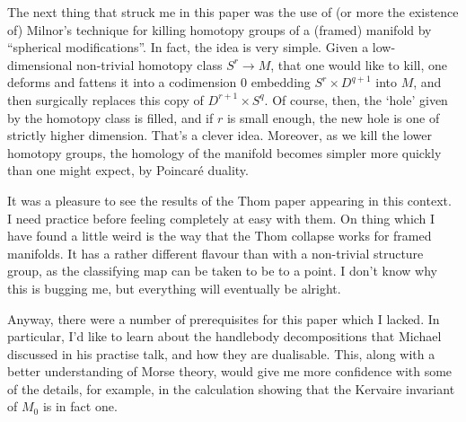 \documentclass[11pt]{article}
\begin{document}
\begin{KervaireNoDifferentiableStructure}
The next thing that struck me in this paper was the use of (or more the existence of) Milnor's technique for killing homotopy groups of a (framed) manifold by ``spherical modifications''. In fact, the idea is very simple. Given a low-dimensional non-trivial homotopy class $S^r\to M$, that one would like to kill, one deforms and fattens it into a codimension 0 embedding $S^r\times D^{q+1}$ into $M$, and then surgically replaces this copy of $D^{r+1}\times S^{q}$. Of course, then, the `hole' given by the homotopy class is filled, and if $r$ is small enough, the new hole is one of strictly higher dimension. That's a clever idea. Moreover, as we kill the lower homotopy groups, the homology of the manifold becomes simpler more quickly than one might expect, by Poincar\'e duality.

It was a pleasure to see the results of the Thom paper appearing in this context. I need practice before feeling completely at easy with them. On thing which I have found a little weird is the way that the Thom collapse works for framed manifolds. It has a rather different flavour than with a non-trivial structure group, as the classifying map can be taken to be to a point. I don't know why this is bugging me, but everything will eventually be alright.

Anyway, there were a number of prerequisites for this paper which I lacked. In particular, I'd like to learn about the handlebody decompositions that Michael discussed in his practise talk, and how they are dualisable. This, along with a better understanding of Morse theory, would give me more confidence with some of the details, for example, in the calculation showing that the Kervaire invariant of $M_0$ is in fact one.

\pagebreak
\end{KervaireNoDifferentiableStructure}
\end{document}
